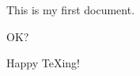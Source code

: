\documentclass{article}
\begin{document}
This is my first document.

OK?

Happy \TeX ing!
\end{document}
